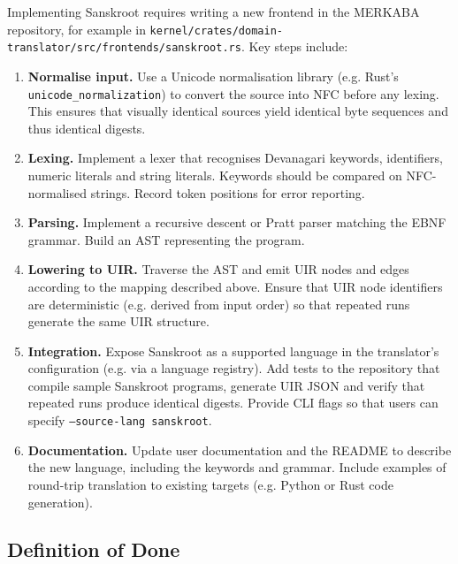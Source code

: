 \documentclass[12pt]{article}
\begin{document}
Implementing Sanskroot requires writing a new frontend in the MERKABA
repository, for example in \texttt{kernel/crates/domain-translator/src/frontends/sanskroot.rs}.
Key steps include:

\begin{enumerate}
  \item \textbf{Normalise input.} Use a Unicode normalisation library
    (e.g. Rust’s \texttt{unicode\_normalization}) to convert the source into
    NFC before any lexing.  This ensures that visually identical sources
    yield identical byte sequences and thus identical digests.

  \item \textbf{Lexing.} Implement a lexer that recognises Devanagari
    keywords, identifiers, numeric literals and string literals.  Keywords
    should be compared on NFC-normalised strings.  Record token positions
    for error reporting.

  \item \textbf{Parsing.} Implement a recursive descent or Pratt parser
    matching the EBNF grammar.  Build an AST representing the program.

  \item \textbf{Lowering to UIR.} Traverse the AST and emit UIR nodes and
    edges according to the mapping described above.  Ensure that UIR node
    identifiers are deterministic (e.g. derived from input order) so that
    repeated runs generate the same UIR structure.

  \item \textbf{Integration.} Expose Sanskroot as a supported language in
    the translator’s configuration (e.g. via a language registry).  Add
    tests to the repository that compile sample Sanskroot programs,
    generate UIR JSON and verify that repeated runs produce identical
    digests.  Provide CLI flags so that users can specify \texttt{--source-lang
    sanskroot}.

  \item \textbf{Documentation.} Update user documentation and the README to
    describe the new language, including the keywords and grammar.  Include
    examples of round-trip translation to existing targets (e.g. Python or
    Rust code generation).
\end{enumerate}

\subsection{Definition of Done}
\end{document}
